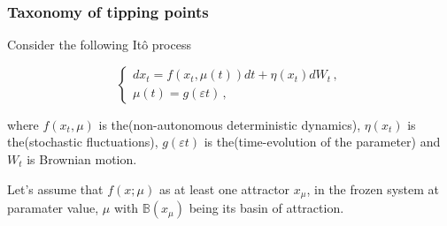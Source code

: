 \documentclass[./main.tex]{subfiles}
\begin{document}
\begin{frame}[t, label=slide04]
        \frametitle{Taxonomy of tipping points}

        \footnotesize

        Consider the following It\^{o} process

        \begin{equation*}
           \begin{cases}
               dx_{t} = f(x_{t},\mu(t))dt + \eta(x_{t})dW_{t}\,, \\
               \mu(t) = g(\varepsilon t)\,, 
           \end{cases}
        \end{equation*}
        
        where $f(x_{t},\mu)$ is the(non-autonomous deterministic dynamics), $\eta(x_{t})$ is the(stochastic fluctuations), $g(\varepsilon t)$ is the(time-evolution of the parameter) and $W_{t}$ is Brownian motion.

        \vspace{3mm}

        Let's assume that $f(x;\mu)$ as at least one attractor $x_{\mu}$, in the frozen system at paramater value, $\mu$ with $\mathbb{B}(x_{\mu})$ being its basin of attraction.


\end{frame}
\end{document}
